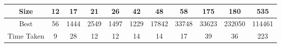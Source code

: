 \documentclass[11pt]{article}
\begin{document}
		\begin{center}
			\begin{tabular}{| c | c | c | c | c | c | c | c | c | c | c |}
				\hline
				Size & 12 & 17 & 21 & 26 & 42 & 48 & 58 & 175 & 180 & 535 \\
				\hline
				Best & 56 & 1444 & 2549 & 1497 & 1229 & 17842 & 33748 & 33623 & 232050 & 114461 \\
				\hline
				Time Taken & 9 & 28 & 12 & 12 & 14 & 14 & 17 & 39 & 36 & 223 \\
				\hline			
			\end{tabular}
		\end{center}
\end{document}
